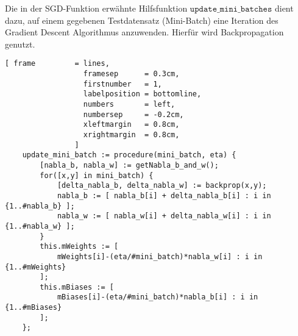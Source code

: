 \noindent
Die in der SGD-Funktion erwähnte Hilfsfunktion $\mathtt{update\_mini\_batches}$ dient dazu, auf einem gegebenen Testdatensatz (Mini-Batch) eine Iteration des Gradient Descent Algorithmus anzuwenden. Hierfür wird Backpropagation genutzt.
\begin{Verbatim}[ frame         = lines, 
                  framesep      = 0.3cm, 
                  firstnumber   = 1,
                  labelposition = bottomline,
                  numbers       = left,
                  numbersep     = -0.2cm,
                  xleftmargin   = 0.8cm,
                  xrightmargin  = 0.8cm,
                ]
    update_mini_batch := procedure(mini_batch, eta) {
        [nabla_b, nabla_w] := getNabla_b_and_w();
        for([x,y] in mini_batch) {
            [delta_nabla_b, delta_nabla_w] := backprop(x,y);
            nabla_b := [ nabla_b[i] + delta_nabla_b[i] : i in {1..#nabla_b} ];
            nabla_w := [ nabla_w[i] + delta_nabla_w[i] : i in {1..#nabla_w} ];
        }
        this.mWeights := [ 
            mWeights[i]-(eta/#mini_batch)*nabla_w[i] : i in {1..#mWeights} 
        ];
        this.mBiases := [ 
            mBiases[i]-(eta/#mini_batch)*nabla_b[i] : i in {1..#mBiases} 
        ];
    };
\end{Verbatim}
